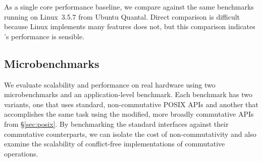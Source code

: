 As a single core performance baseline, we compare against the same
benchmarks running on Linux~3.5.7 from Ubuntu Quantal.  Direct
comparison is difficult because
Linux implements many features \sys does not, but this comparison
indicates \sys's performance is sensible.

\subsection{Microbenchmarks}
\label{sec:eval:microbenchmarks}




We evaluate scalability and performance on real hardware using two
microbenchmarks and an application-level benchmark.  Each benchmark has
two variants, one that uses standard, non-commutative POSIX APIs and
another that accomplishes the same task using the modified, more broadly
commutative APIs from \S\ref{sec:posix}.
%
By benchmarking the standard interfaces against
their commutative counterparts, we can isolate the cost of
non-commutativity and also examine the scalability of
conflict-free implementations of commutative operations.

